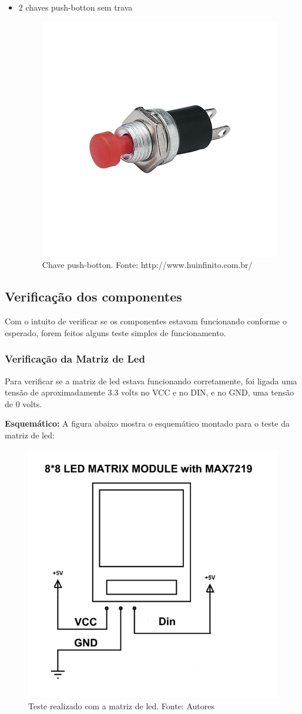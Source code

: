 \documentclass[conference]{IEEEtran}
\begin{document}
\begin{itemize}
  \item 2 chaves push-botton sem trava
    \begin{figure}[H]
      \centering
      \includegraphics[width=0.5\linewidth]{push}
      \caption{Chave push-botton. Fonte: http://www.huinfinito.com.br/}
      \label{fig:push}
    \end{figure}

\end{itemize}

\subsection{Verificação dos componentes}
Com o intuito de verificar se os componentes estavam funcionando conforme o esperado, forem feitos alguns teste simples de funcionamento.
\subsubsection{Verificação da Matriz de Led}
Para verificar se a matriz de led estava funcionando corretamente, foi ligada uma tensão de aproximadamente 3.3 volts no VCC e no DIN, e no GND, uma tensão de 0 volts.

\textbf{Esquemático:}
A figura abaixo mostra o esquemático montado para o teste da matriz de led:
\begin{figure}[H]
  \centering
  \includegraphics[width=0.5\linewidth]{dot}
  \caption{Teste realizado com a matriz de led. Fonte: Autores}
  \label{fig:dem_dot}
\end{figure}
\end{document}
